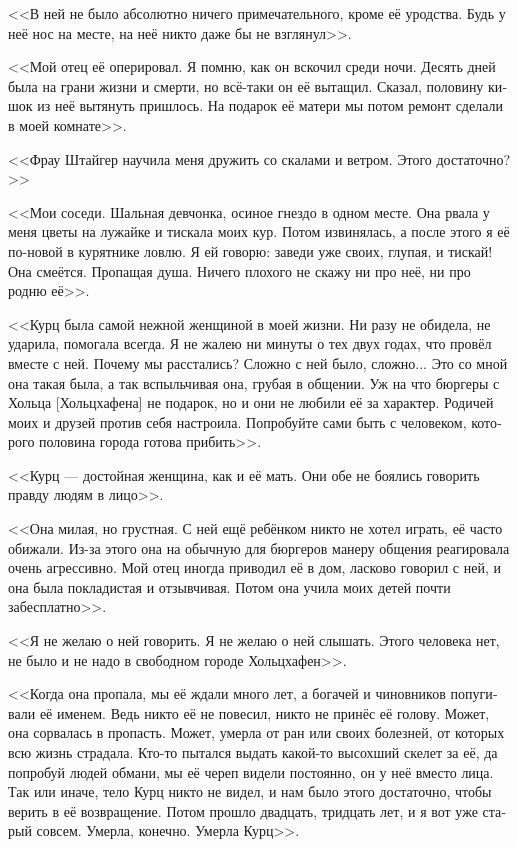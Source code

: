 \documentclass[a4paper,12pt,fleqn]{book}\usepackage{polyglossia}\setdefaultlanguage[babelshorthands=true]{russian}\setotherlanguage{english}\defaultfontfeatures{Ligatures=TeX,Mapping=tex-text}\usepackage{xcolor}\newcommand{\ml}[3]{#2}
\begin{document}
<<В ней не было абсолютно ничего примечательного, кроме её уродства.
Будь у неё нос на месте, на неё никто даже бы не взглянул>>.

<<Мой отец её оперировал.
Я помню, как он вскочил среди ночи.
Десять дней была на грани жизни и смерти, но всё-таки он её вытащил.
Сказал, половину кишок из неё вытянуть пришлось.
На подарок её матери мы потом ремонт сделали в моей комнате>>.

<<Фрау Штайгер научила меня дружить со скалами и ветром.
Этого достаточно?>>

<<Мои соседи.
Шальная девчонка, осиное гнездо в одном месте.
Она рвала у меня цветы на лужайке и тискала моих кур.
Потом извинялась, а после этого я её по-новой в курятнике ловлю.
Я ей говорю: заведи уже своих, глупая, и тискай!
Она смеётся.
Пропащая душа.
Ничего плохого не скажу ни про неё, ни про родню её>>.

<<Курц была самой нежной женщиной в моей жизни.
Ни разу не обидела, не ударила, помогала всегда.
Я не жалею ни минуты о тех двух годах, что провёл вместе с ней.
Почему мы расстались?
Сложно с ней было, сложно...
Это со мной она такая была, а так вспыльчивая она, грубая в общении.
Уж на что бюргеры с Хольца [Хольцхафена] не подарок, но и они не любили её за характер.
Родичей моих и друзей против себя настроила.
Попробуйте сами быть с человеком, которого половина города готова прибить>>.

<<Курц --- достойная женщина, как и её мать.
Они обе не боялись говорить правду людям в лицо>>.

<<Она милая, но грустная.
С ней ещё ребёнком никто не хотел играть, её часто обижали.
Из-за этого она на обычную для бюргеров манеру общения реагировала очень агрессивно.
Мой отец иногда приводил её в дом, ласково говорил с ней, и она была покладистая и отзывчивая.
Потом она учила моих детей почти забесплатно>>.

<<Я не желаю о ней говорить.
Я не желаю о ней слышать.
Этого человека нет, не было и не надо в свободном городе Хольцхафен>>.

<<Когда она пропала, мы её ждали много лет, а богачей и чиновников попугивали её именем.
Ведь никто её не повесил, никто не принёс её голову.
Может, она сорвалась в пропасть.
Может, умерла от ран или своих болезней, от которых всю жизнь страдала.
Кто-то пытался выдать какой-то высохший скелет за её, да попробуй людей обмани, мы её череп видели постоянно, он у неё вместо лица.
Так или иначе, тело Курц никто не видел, и нам было этого достаточно, чтобы верить в её возвращение.
Потом прошло двадцать, тридцать лет, и я вот уже старый совсем.
Умерла, конечно.
Умерла Курц>>.
\end{document}
